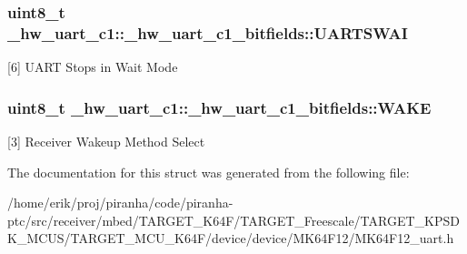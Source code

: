\subsubsection[{\texorpdfstring{U\+A\+R\+T\+S\+W\+AI}{UARTSWAI}}]{\setlength{\rightskip}{0pt plus 5cm}uint8\+\_\+t \+\_\+hw\+\_\+uart\+\_\+c1\+::\+\_\+hw\+\_\+uart\+\_\+c1\+\_\+bitfields\+::\+U\+A\+R\+T\+S\+W\+AI}\hypertarget{struct__hw__uart__c1_1_1__hw__uart__c1__bitfields_a21eb69d7bb4874279ec01efb822b5a53}{}\label{struct__hw__uart__c1_1_1__hw__uart__c1__bitfields_a21eb69d7bb4874279ec01efb822b5a53}
\mbox{[}6\mbox{]} U\+A\+RT Stops in Wait Mode 
\subsubsection[{\texorpdfstring{W\+A\+KE}{WAKE}}]{\setlength{\rightskip}{0pt plus 5cm}uint8\+\_\+t \+\_\+hw\+\_\+uart\+\_\+c1\+::\+\_\+hw\+\_\+uart\+\_\+c1\+\_\+bitfields\+::\+W\+A\+KE}\hypertarget{struct__hw__uart__c1_1_1__hw__uart__c1__bitfields_a18d45042ee4607b104437a52e489dada}{}\label{struct__hw__uart__c1_1_1__hw__uart__c1__bitfields_a18d45042ee4607b104437a52e489dada}
\mbox{[}3\mbox{]} Receiver Wakeup Method Select 

The documentation for this struct was generated from the following file\+:\begin{DoxyCompactItemize}
\item 
/home/erik/proj/piranha/code/piranha-\/ptc/src/receiver/mbed/\+T\+A\+R\+G\+E\+T\+\_\+\+K64\+F/\+T\+A\+R\+G\+E\+T\+\_\+\+Freescale/\+T\+A\+R\+G\+E\+T\+\_\+\+K\+P\+S\+D\+K\+\_\+\+M\+C\+U\+S/\+T\+A\+R\+G\+E\+T\+\_\+\+M\+C\+U\+\_\+\+K64\+F/device/device/\+M\+K64\+F12/M\+K64\+F12\+\_\+uart.\+h\end{DoxyCompactItemize}
